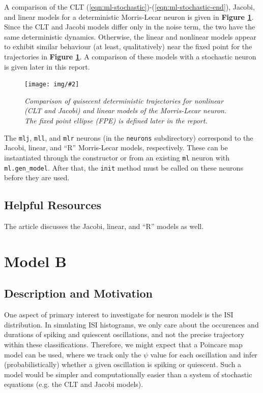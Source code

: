 \documentclass[letterpaper,12pt]{article}
\numberwithin{table}{section}
\numberwithin{figure}{section}
\numberwithin{equation}{section}
\newcommand{\centerfig}[2]{\begin{center}\texttt{[image: img/\#2]}\end{center}}
\newcommand{\ccaption}[1]{\caption{\textit{#1}}}
\newcommand{\reffig}[1]{\textbf{Figure \ref{#1}}}
\begin{document}
\begin{flushleft}
    A comparison of the CLT (\ref{eqn:ml-stochastic})-(\ref{eqn:ml-stochastic-end}), Jacobi, and linear models for a deterministic Morris-Lecar neuron is given in \reffig{fig:det-comp}. Since the CLT and Jacobi models differ only in the noise term, the two have the same deterministic dynamics. Otherwise, the linear and nonlinear models appear to exhibit similar behaviour (at least, qualitatively) near the fixed point for the trajectories in \reffig{fig:det-comp}. A comparison of these models with a stochastic neuron is given later in this report.
    \begin{figure}[h]

        \centering
 
        \centerfig{0.8}{det-comp.jpg}
    
        \captionsetup{width=0.85\linewidth}
        \ccaption{Comparison of quisecent deterministic trajectories for nonlinear (CLT and Jacobi) and linear models of the Morris-Lecar neuron. The fixed point ellipse (FPE) is defined later in the report.}
        \label{fig:det-comp}
    
    \end{figure}

    The \texttt{mlj}, \texttt{mll}, and \texttt{mlr} neurons (in the \texttt{neurons} subdirectory) correspond to the Jacobi, linear, and ``R'' Morris-Lecar models, respectively. These can be instantiated through the constructor or from an existing \texttt{ml} neuron with \texttt{ml.gen\_model}. After that, the \texttt{init} method must be called on these neurons before they are used.

    \subsection{Helpful Resources}
    The article \cite{dg} discusses the Jacobi, linear, and ``R'' models as well.

    \pagebreak

    \section{Model B}

    \subsection{Description and Motivation}

    One aspect of primary interest to investigate for neuron models is the ISI distribution. In simulating ISI histograms, we only care about the occurences and durations of spiking and quiescent oscillations, and not the precise trajectory within these classifications. Therefore, we might expect that a Poincare map model can be used, where we track only the $\psi$ value for each oscillation and infer (probabilistically) whether a given oscillation is spiking or quiescent. Such a model would be simpler and computationally easier than a system of stochastic equations (e.g. the CLT and Jacobi models).


\end{flushleft}
\end{document}
